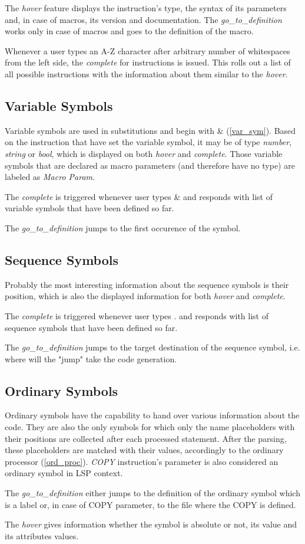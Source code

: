 The \emph{hover} feature displays the instruction's type, the syntax of its parameters and, in case of macros, its version and documentation. The \emph{go\_to\_definition} works only in case of macros and goes to the definition of the macro.

Whenever a user types an A-Z character after arbitrary number of whitespaces from the left side, the \emph{complete} for instructions is issued. This rolls out a list of all possible instructions with the information about them similar to the \emph{hover}.

\subsection{Variable Symbols}

Variable symbols are used in substitutions and begin with \& (\cref{var_sym}). Based on the instruction that have set the variable symbol, it may be of type \emph{number}, \emph{string} or \emph{bool}, which is displayed on both \emph{hover} and \emph{complete}. Those variable symbols that are declared as macro parameters (and therefore have no type) are labeled as \emph{Macro Param}.

The \emph{complete} is triggered whenever user types \& and responds with list of variable symbols that have been defined so far.

The \emph{go\_to\_definition} jumps to the first occurence of the symbol.

\subsection{Sequence Symbols}

Probably the most interesting information about the sequence symbols is their position, which is also the displayed information for both \emph{hover} and \emph{complete}.

The \emph{complete} is triggered whenever user types . and responds with list of sequence symbols that have been defined so far.

The \emph{go\_to\_definition} jumps to the target destination of the sequence symbol, i.e. where will the "jump" take the code generation.

\subsection{Ordinary Symbols}

Ordinary symbols have the capability to hand over various information about the code. They are also the only symbols for which only the name placeholders with their positions are collected after each processed statement. After the parsing, these placeholders are matched with their values, accordingly to the ordinary processor (\cref{ord_proc}). \emph{COPY} instruction's parameter is also considered an ordinary symbol in LSP context.  

The \emph{go\_to\_definition} either jumps to the definition of the ordinary symbol which is a label or, in case of COPY parameter, to the file where the COPY is defined.

The \emph{hover} gives information whether the symbol is absolute or not, its value and its attributes values. 




